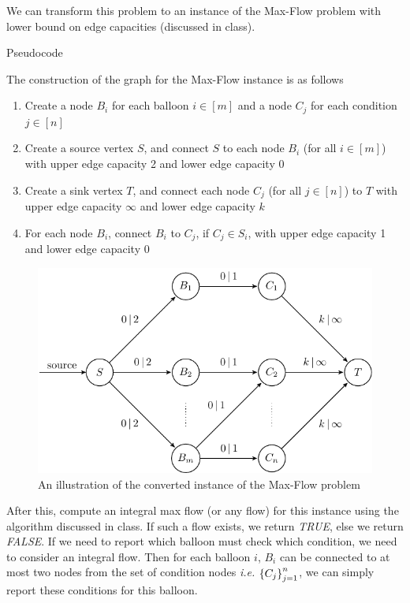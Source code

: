 \documentclass{article}
\begin{document}
\begin{question}
	
	\begin{qpart}{1}

		We can transform this problem to an instance of the Max-Flow problem with lower bound on edge capacities (discussed in class).

		\begin{qsection}{Pseudocode}

			The construction of the graph for the Max-Flow instance is as follows

			\begin{enumerate}
				\item Create a node $B_i$ for each balloon $i \in [m]$ and a node $C_j$ for each condition $j \in [n]$
				\item Create a source vertex $S$, and connect $S$ to each node $B_i$ (for all $i \in [m]$) with upper edge capacity 2 and lower edge capacity 0
				\item Create a sink vertex $T$, and connect each node $C_j$ (for all $j \in [n]$) to $T$ with upper edge capacity $\infty$ and lower edge capacity $k$ 
				\item For each node $B_i$, connect $B_i$ to $C_j$, if $C_j \in S_i$, with upper edge capacity 1 and lower edge capacity 0
			\end{enumerate}

			\begin{figure}[h!]
				\centering
				\includegraphics{q1-max-flow-instance.pdf}
				\caption{An illustration of the converted instance of the Max-Flow problem}
			\end{figure}

			After this, compute an integral max flow (or any flow) for this instance using the algorithm discussed in class. If such a flow exists, we return \textit{TRUE}, else we return \textit{FALSE}. If we need to report which balloon must check which condition, we need to consider an integral flow. Then for each balloon $i$, $B_i$ can be connected to at most two nodes from the set of condition nodes \textit{i.e.} $\left\{ C_j \right\}_{j = 1}^{n}$, we can simply report these conditions for this balloon.


\end{qsection}
\end{qpart}
\end{question}
\end{document}
